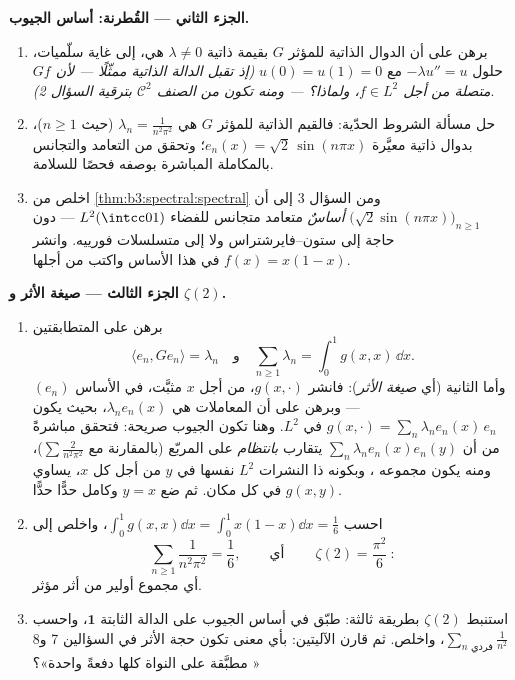 \begin{problem}
\medskip
\noindent\textbf{الجزء الثاني --- القُطرنة: أساس الجيوب.}
\begin{enumerate}[resume]
  \item برهن على أن الدوال الذاتية للمؤثر $G$ بقيمة ذاتية
        $\lambda \ne 0$ هي، إلى غاية سلّميات، حلول $-\lambda u'' = u$ مع
        $u(0) = u(1) = 0$ \emph{(إذ تقبل الدالة الذاتية ممثّلًا 
        --- لأن $Gf$ متصلة من أجل $f \in L^2$، ولماذا؟ ---
        ومنه تكون من الصنف $\mathcal C^2$ بترقية السؤال 2)}.
  \item حل مسألة الشروط الحدّية: فالقيم الذاتية للمؤثر $G$ هي
        $\lambda_n = \frac1{n^2\pi^2}$ (حيث $n \geq 1$)، بدوال ذاتية معيَّرة $e_n(x) =
        \sqrt2\,\sin(n\pi x)$؛
        وتحقق من التعامد والتجانس بالمكاملة المباشرة بوصفه
        فحصًا للسلامة.
  \item اخلص من \cref{thm:b3:spectral:spectral} ومن السؤال 3 إلى أن $\bigl(\sqrt2\sin(n\pi x)\bigr)_{n\geq1}$
        \emph{أساسٌ} متعامد متجانس للفضاء $L^2(\intcc01)$ ---
        دون حاجة إلى ستون--فايرشتراس ولا إلى متسلسلات فورييه.
        وانشر $f(x) = x(1-x)$ في هذا الأساس واكتب  من
        أجلها.
\end{enumerate}

\medskip
\noindent\textbf{الجزء الثالث --- صيغة الأثر و $\zeta(2)$.}
\begin{enumerate}[resume]
  \item برهن على المتطابقتين
        \[
        \langle e_n, Ge_n\rangle = \lambda_n
        \quad\text{و}\quad
        \sum_{n\geq1}\lambda_n = \int_0^1 g(x,x)\,\dd x .
        \]
        وأما الثانية (أي \emph{صيغة الأثر}): فانشر
        $g(x, \cdot)$، من أجل $x$ مثبَّت، في الأساس $(e_n)$
        --- وبرهن على أن المعاملات هي $\lambda_ne_n(x)$، بحيث يكون
        $g(x, \cdot) = \sum_n\lambda_ne_n(x)\,e_n$ في $L^2$. وهنا تكون الجيوب صريحة: فتحقق
        مباشرةً من أن $\sum_n\lambda_ne_n(x)e_n(y)$ يتقارب \emph{بانتظام} على المربّع
        (بالمقارنة مع $\sum
        \frac2{n^2\pi^2}$)، ومنه يكون مجموعه ،
        وبكونه ذا النشرات $L^2$ نفسها في $y$ من أجل كل $x$،
        يساوي $g(x,y)$ في كل مكان. ثم ضع $y = x$ وكامل حدًّا
        حدًّا.
  \item احسب $\int_0^1g(x,x)\dd x = \int_0^1x(1-x)\dd x =
        \frac16$، واخلص إلى
        \[
        \sum_{n\geq1}\frac{1}{n^2\pi^2} = \frac16,
        \qquad\text{أي}\qquad
        \boxed{\ \zeta(2) = \frac{\pi^2}{6}\ } :
        \]
        أي مجموع أولير من أثر مؤثر.
  \item استنبط $\zeta(2)$ بطريقة ثالثة: طبّق  في أساس
        الجيوب على الدالة الثابتة $\mathbf 1$، واحسب $\sum_{n \text{ فردي}}\frac1{n^2}$،
        واخلص. ثم قارن الآليتين: بأي معنى تكون حجة الأثر في
        السؤالين 7 و8 « مطبَّقة على النواة كلها
        دفعةً واحدة»؟
\end{enumerate}


\end{problem}
